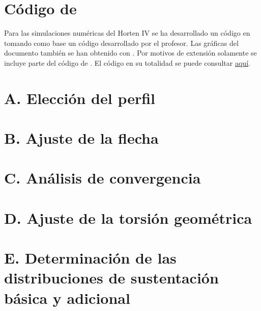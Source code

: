 
\appendix

\section*{\textbf{Código de \MATLAB}}

Para las simulaciones numéricas del Horten IV se ha desarrollado un código en \MATLAB tomando como base un código desarrollado por el profesor. Las gráficas del documento también se han obtenido con \MATLAB. Por motivos de extensión solamente se incluye parte del código de \MATLAB. El código en su totalidad se puede consultar \href{https://github.com/plosan/aerodynamics_homework_2}{aquí}.


\section*{A. Elección del perfil}
\vspace*{-5mm}


\section*{B. Ajuste de la flecha}
\vspace*{-5mm}

\vspace*{-5mm}


\section*{C. Análisis de convergencia}
\vspace*{-5mm}


\section*{D. Ajuste de la torsión geométrica}
\vspace*{-5mm}


\section*{E. Determinación de las distribuciones de sustentación básica y adicional}
\vspace*{-5mm}


